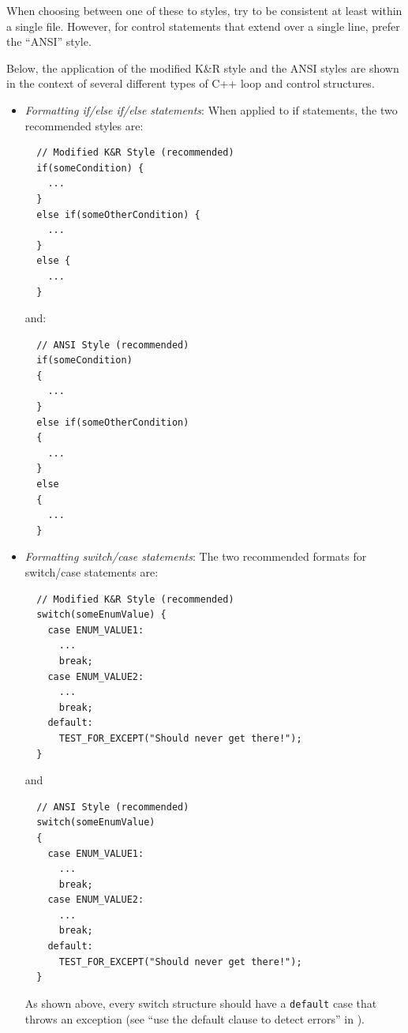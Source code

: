 \begin{itemize}
When choosing between one of these to styles, try to be consistent at least
within a single file.  However, for control statements that extend over a
single line, prefer the ``ANSI'' style.

Below, the application of the modified K\&R style and the ANSI styles are
shown in the context of several different types of C++ loop and control
structures.

  \begin{itemize}

  {}\item\textit{Formatting if/else if/else
  statements}: When applied to if statements, the two recommended styles are:

  {\small\begin{verbatim}
  // Modified K&R Style (recommended)
  if(someCondition) {
    ...
  }
  else if(someOtherCondition) {
    ...
  }
  else {
    ...
  }
  \end{verbatim}}
  
  {}\noindent{}and:
  
  {\small\begin{verbatim}
  // ANSI Style (recommended)
  if(someCondition)
  {
    ...
  }
  else if(someOtherCondition)
  {
    ...
  }
  else
  {
    ...
  }
  \end{verbatim}}

  {}\item\textit{Formatting switch/case statements}:
  The two recommended formats for switch/case statements are:

  {\small\begin{verbatim}
  // Modified K&R Style (recommended)
  switch(someEnumValue) {
    case ENUM_VALUE1:
      ...
      break;
    case ENUM_VALUE2:
      ...
      break;
    default:
      TEST_FOR_EXCEPT("Should never get there!");
  }
  \end{verbatim}}

  {}\noindent{}and

  {\small\begin{verbatim}
  // ANSI Style (recommended)
  switch(someEnumValue)
  {
    case ENUM_VALUE1:
      ...
      break;
    case ENUM_VALUE2:
      ...
      break;
    default:
      TEST_FOR_EXCEPT("Should never get there!");
  }
  \end{verbatim}}

  As shown above, every switch structure should have a {}\texttt{default} case
  that throws an exception (see ``use the default clause to detect errors''
  in {}\cite[Section 15.1]{CodeComplete2nd04}).


\end{itemize}
\end{itemize}
